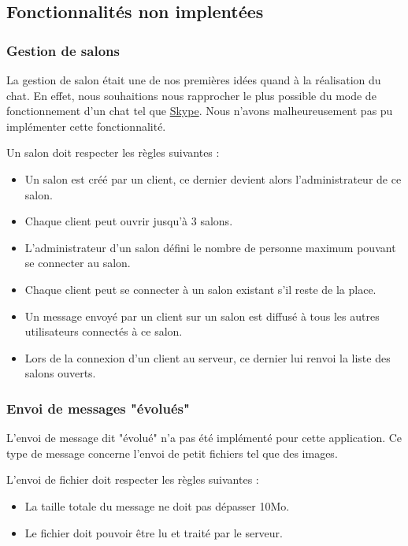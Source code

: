     \subsection{Fonctionnalités non implentées}
    \label{subsec:fct-non-implemente}
        
        \subsubsection{Gestion de salons}
            La gestion de salon était une de nos premières idées quand à la réalisation du chat. En effet, nous souhaitions nous rapprocher le plus possible du mode de fonctionnement d'un chat tel que \href{https://www.skype.com/fr/}{Skype}. Nous n'avons malheureusement pas pu implémenter cette fonctionnalité.
            
            Un salon doit respecter les règles suivantes :
            \begin{itemize}
                \item Un salon est créé par un client, ce dernier devient alors l'administrateur de ce salon.
                \item Chaque client peut ouvrir jusqu'à 3 salons.
                \item L'administrateur d'un salon défini le nombre de personne maximum pouvant se connecter au salon.
                \item Chaque client peut se connecter à un salon existant s'il reste de la place.
                \item Un message envoyé par un client sur un salon est diffusé à tous les autres utilisateurs connectés à ce salon.
                \item Lors de la connexion d'un client au serveur, ce dernier lui renvoi la liste des salons ouverts.
            \end{itemize}
        
        \subsubsection{Envoi de messages "évolués"}
            L'envoi de message dit "évolué" n'a pas été implémenté pour cette application. Ce type de message concerne l'envoi de petit fichiers tel que des images.
            
            L'envoi de fichier doit respecter les règles suivantes : 
            \begin{itemize}
                \item La taille totale du message ne doit pas dépasser 10Mo.
                \item Le fichier doit pouvoir être lu et traité par le serveur.
            \end{itemize}